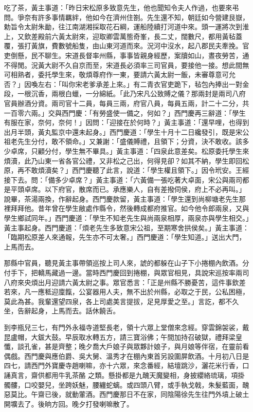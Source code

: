吃了茶，黃主事道：「昨日宋松原多致意先生，他也聞知令夫人作過，也要來弔問。爭奈有許多事情羈絆，他如今在濟州住劄。先生還不知，朝廷如今營建艮嶽，勅旨令太尉朱勔，往江南湖湘採取花石綱，運船陸續打河道中來。頭一運將次到淮上，又欽差殿前六黃太尉來，迎取卿雲萬態奇峯，長二丈，闊數尺，都用黃毡蓋覆，張打黃旗，費數號船隻，由山東河道而來。況河中沒水，起八郡民夫牽挽。官吏倒懸，民不聊生。宋道長督率州縣，事事皆親身經歷，案牘如山，晝夜勞苦，通不得閒。況黃大尉不久自京而至，宋道長必須率三司官員，要接他一接。想此間無可相熟者，委托學生來，敬煩尊府作一東，要請六黃太尉一飯，未審尊意可允否？」因喚左右：「叫你宋老爹承差上來。」有二青衣官吏跪下，毡包內捧出一對金段，一根沉香，兩根白蠟，一分綿紙。「此乃宋凡公致賻之儀？那兩封是兩司八府官員辦酒分資。兩司官十二員，每員三兩，府官八員，每員五兩，計二十二分，共一百零六兩。」交與西門慶：「有勞盛使一備之，何如？」西門慶再三辭道：「學生有服在家，奈何，奈何！」因問：「迎接在於何時？」黃主事道：「還早哩，也得到出月半頭，黃丸監京中還未起身。」西門慶道：「學生十月十二日纔發引，既是宋公祖老先生分付，敢不領命。」又兼謝：「盛儀賻禮，且領下；分資，決不敢收。該多少卓席，只顧分付，學生無不畢具。」黃主事道：「四泉此意差矣。松原委托學生來煩瀆，此乃山東一省各官公禮，又非松之己出，何得見卻？如其不納，學生即回松原，再不敢煩瀆矣？」西門慶聽了此言，說道：「學生權且領下。」因令玳安。王經接下去。問：「備多少卓席？」黃主事道：「六黃備一張吃著大卓面，宋公與兩司都是平頭卓席。以下府官，散席而已。承應樂人，自有差撥伺侯，府上不必再叫。」說畢，茶湯兩換，作辭起身。西門慶款留，黃主事道：「學生還到尚柳塘老先生那裡拜拜他。昔年曾在學生敝處作縣令，然後轉成都府推官。如今他令郎兩泉，又與學生鄉試同年。」西門慶道：「學生不知老先生與尚兩泉相厚，兩泉亦與學生相交。」黃主事起身。西門慶道：「煩老先生多致意宋公祖，至期寒舍拱侯矣。」黃主事道：「臨期松原差人來通報，先生亦不可太奢。」西門慶道：「學生知道。」送出大門，上馬而去。

那縣中官員，聽見黃主事帶領巡按上司人來，諕的都躲在山子下小捲棚內飲酒。分付手下，把轎馬藏過一邊。當時西門慶回到捲棚，與眾官相見，具說宋巡按率兩司八府來央煩出月迎請六黃太尉之事。眾官悉言：「正是州縣不勝憂苦，這件事欽差若來，凡一應秪迎廩餼，公宴器用人夫，無不出於州縣，必取之于民，公私困極，莫此為甚。我輩還望四泉，各上司處美言提拔，足見厚愛之至。」言訖，都不久坐，告辭起身，上馬而去。話休饒舌。

到李瓶兒三七，有門外永福寺道堅長老，領十六眾上堂僧來念經。穿雲錦袈裟，戴昆盧帽，大鈸大鼓。早辰取水轉五方，請三寶浴佛；午間加持召破獄，禮拜梁皇懺，談孔雀，甚是齊整；晚夕喬大戶娘子與眾夥計娘子，與月娘等伴宿，在靈前看偶戲。西門慶與應伯爵、吳大舅、溫秀才在棚內東首另設圍屏飲酒。十月初八日是四七，請西門外寶慶寺趙喇嘛，亦十六眾，來念番經，結壇跳沙，灑花米行香，口誦真言，齋供都用牛乳茶酪 之類。懸掛都是九醜天魔變相，身披纓絡琉璃，項掛髑髏，口咬嬰兒，坐跨妖魅，腰纏蛇螭。或四頭八臂，或手執戈戟，朱髮藍面，醜惡莫比。午齋已後，就動葷酒。西門慶那日不在家，同陰陽徐先生往門外墳上破土開壙去了。後晌方回。晚夕打發喇嘛散了。

